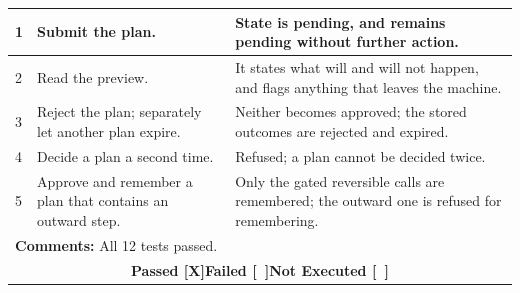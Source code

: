 \documentclass{FastFyp}
\begin{document}
{\begin{longtable}{|p{2.4cm}p{5.0cm}p{2.4cm}p{3.8cm}|}
\multicolumn{1}{|p{2.4cm}|}{1} & \multicolumn{1}{p{5.0cm}|}{Submit the plan.} & \multicolumn{2}{p{6.6cm}|}{State is pending, and remains pending without further action.} \\ \hline
\multicolumn{1}{|p{2.4cm}|}{2} & \multicolumn{1}{p{5.0cm}|}{Read the preview.} & \multicolumn{2}{p{6.6cm}|}{It states what will and will not happen, and flags anything that leaves the machine.} \\ \hline
\multicolumn{1}{|p{2.4cm}|}{3} & \multicolumn{1}{p{5.0cm}|}{Reject the plan; separately let another plan expire.} & \multicolumn{2}{p{6.6cm}|}{Neither becomes approved; the stored outcomes are rejected and expired.} \\ \hline
\multicolumn{1}{|p{2.4cm}|}{4} & \multicolumn{1}{p{5.0cm}|}{Decide a plan a second time.} & \multicolumn{2}{p{6.6cm}|}{Refused; a plan cannot be decided twice.} \\ \hline
\multicolumn{1}{|p{2.4cm}|}{5} & \multicolumn{1}{p{5.0cm}|}{Approve and remember a plan that contains an outward step.} & \multicolumn{2}{p{6.6cm}|}{Only the gated reversible calls are remembered; the outward one is refused for remembering.} \\ \hline
\multicolumn{4}{|p{14.8cm}|}{\textbf{Comments:} All 12 tests passed.} \\ \hline
\multicolumn{4}{|c|}{\textbf{Passed [X]\quad Failed [\ ]\quad Not Executed [\ ]}} \\ \hline
\end{longtable}
}
\end{document}
